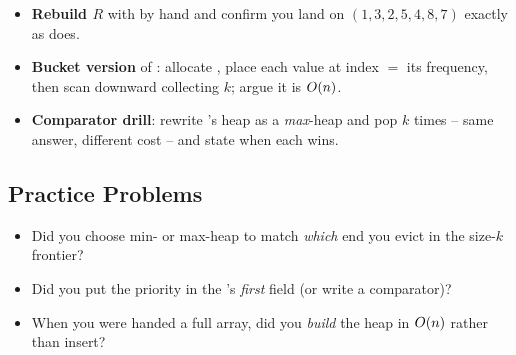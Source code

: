 \begin{hardeningbox}
\begin{itemize}[nosep, leftmargin=1.4em]
  \item \textbf{Rebuild $R$} with  by hand and confirm you land on $(1,3,2,5,4,8,7)$
        exactly as  does.
  \item \textbf{Bucket version} of : allocate ,
        place each value at index $=$ its frequency, then scan downward collecting $k$; argue it is $O(n)$.
  \item \textbf{Comparator drill}: rewrite 's heap as a \emph{max}-heap and pop $k$
        times -- same answer, different cost -- and state when each wins.
\end{itemize}
\end{hardeningbox}

\subsection{Practice Problems}

\begin{stuckbox}
\begin{itemize}[nosep, leftmargin=1.4em]
  \item Did you choose min- or max-heap to match \emph{which} end you evict in the size-$k$ frontier?
  \item Did you put the priority in the 's \emph{first} field (or write a comparator)?
  \item When you were handed a full array, did you \emph{build} the heap in $O(n)$ rather than insert?
\end{itemize}
\end{stuckbox}

